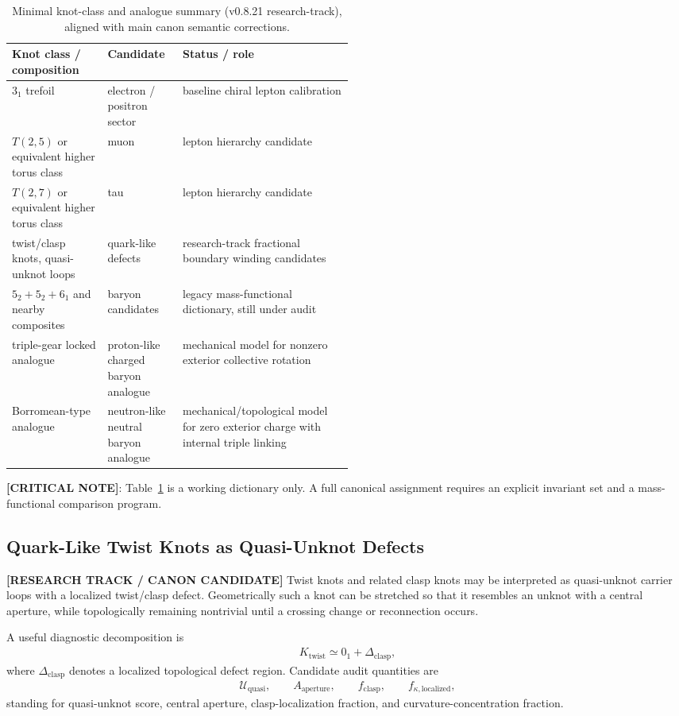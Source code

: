 \begin{table}[h]
\centering
\begin{tabularx}{\linewidth}{p{0.28\linewidth}p{0.22\linewidth}X}
\hline
Knot class / composition & Candidate & Status / role \\
\hline
$3_1$ trefoil & electron / positron sector & baseline chiral lepton calibration \\
$T(2,5)$ or equivalent higher torus class & muon & lepton hierarchy candidate \\
$T(2,7)$ or equivalent higher torus class & tau & lepton hierarchy candidate \\
twist/clasp knots, quasi-unknot loops & quark-like defects & research-track fractional boundary winding candidates \\
$5_2+5_2+6_1$ and nearby composites & baryon candidates & legacy mass-functional dictionary, still under audit \\
triple-gear locked analogue & proton-like charged baryon analogue & mechanical model for nonzero exterior collective rotation \\
Borromean-type analogue & neutron-like neutral baryon analogue & mechanical/topological model for zero exterior charge with internal triple linking \\
\hline
\end{tabularx}
\caption{Minimal knot-class and analogue summary (v0.8.21 research-track), aligned with main canon semantic corrections.}
\label{tab:particle-candidates}
\end{table}

\textbf{[CRITICAL NOTE]}: Table~\ref{tab:particle-candidates} is a working dictionary only. A full canonical assignment requires an explicit invariant set and a mass-functional comparison program.


\subsection{Quark-Like Twist Knots as Quasi-Unknot Defects}
\label{subsec:rt_quark_twist_quasi_unknot}

\textbf{[RESEARCH TRACK / CANON CANDIDATE]} Twist knots and related clasp knots may be interpreted as quasi-unknot carrier loops with a localized twist/clasp defect. Geometrically such a knot can be stretched so that it resembles an unknot with a central aperture, while topologically remaining nontrivial until a crossing change or reconnection occurs.

A useful diagnostic decomposition is
\begin{align}
    K_{\mathrm{twist}}
    \simeq
    0_1 + \Delta_{\mathrm{clasp}},
\end{align}
where $\Delta_{\mathrm{clasp}}$ denotes a localized topological defect region. Candidate audit quantities are
\begin{align}
    \mathcal{U}_{\mathrm{quasi}},\qquad
    A_{\mathrm{aperture}},\qquad
    f_{\mathrm{clasp}},\qquad
    f_{\kappa,\mathrm{localized}},
\end{align}
standing for quasi-unknot score, central aperture, clasp-localization fraction, and curvature-concentration fraction.


